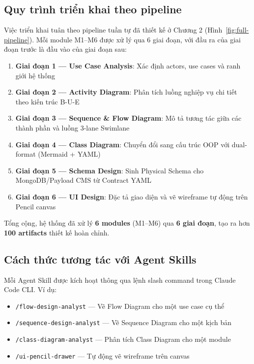 \documentclass[13pt,a4paper,oneside]{extreport}
\numberwithin{equation}{chapter}
\numberwithin{figure}{chapter}
\numberwithin{table}{chapter}
\begin{document}
\subsection{Quy trình triển khai theo pipeline}

Việc triển khai tuân theo pipeline tuần tự đã thiết kế ở Chương 2 (Hình~\ref{fig:full-pipeline}). Mỗi module M1--M6 được xử lý qua 6 giai đoạn, với đầu ra của giai đoạn trước là đầu vào của giai đoạn sau:

\begin{enumerate}
    \item \textbf{Giai đoạn 1 — Use Case Analysis}: Xác định actors, use cases và ranh giới hệ thống
    \item \textbf{Giai đoạn 2 — Activity Diagram}: Phân tích luồng nghiệp vụ chi tiết theo kiến trúc B-U-E
    \item \textbf{Giai đoạn 3 — Sequence \& Flow Diagram}: Mô tả tương tác giữa các thành phần và luồng 3-lane Swimlane
    \item \textbf{Giai đoạn 4 — Class Diagram}: Chuyển đổi sang cấu trúc OOP với dual-format (Mermaid + YAML)
    \item \textbf{Giai đoạn 5 — Schema Design}: Sinh Physical Schema cho MongoDB/Payload CMS từ Contract YAML
    \item \textbf{Giai đoạn 6 — UI Design}: Đặc tả giao diện và vẽ wireframe tự động trên Pencil canvas
\end{enumerate}

Tổng cộng, hệ thống đã xử lý \textbf{6 modules} (M1--M6) qua \textbf{6 giai đoạn}, tạo ra hơn \textbf{100 artifacts} thiết kế hoàn chỉnh.

\subsection{Cách thức tương tác với Agent Skills}

Mỗi Agent Skill được kích hoạt thông qua lệnh slash command trong Claude Code CLI. Ví dụ:

\begin{itemize}
    \item \texttt{/flow-design-analyst} — Vẽ Flow Diagram cho một use case cụ thể
    \item \texttt{/sequence-design-analyst} — Vẽ Sequence Diagram cho một kịch bản
    \item \texttt{/class-diagram-analyst} — Phân tích Class Diagram cho một module
    \item \texttt{/ui-pencil-drawer} — Tự động vẽ wireframe trên canvas
\end{itemize}
\end{document}

